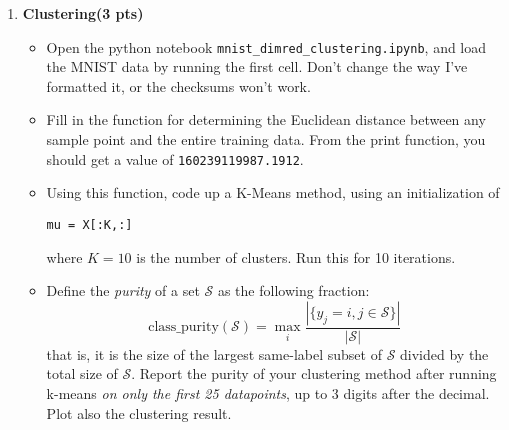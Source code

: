 \documentclass{article}
\newcommand{\mS}{\mathcal S}
\newcommand{\showpoints}[1]{\textbf{(#1 pts)} }
\begin{document}
\begin{enumerate}
\begin{enumerate}
\item \showpoints{1}  The probability that I wear a tank top, independently of all the other clothes, is 75\% if it's raining and 25\% if it's not raining.
\begin{itemize}
\item
Today is Monday and it is raining.

\item 
The probability that it will rain, given that the previous day rained, is 70\%. The probability that it will rain, given that the previous day did not rain, is 10\%. 

\end{itemize}
Draw a graphical model predicting whether I will wear a tank top on Wednesday, and calculate this probability.



\end{enumerate}






\item \textbf{Clustering}\showpoints{3} 



\begin{itemize}
\item Open the python notebook \texttt{mnist\_dimred\_clustering.ipynb}, and load the MNIST data by running the first cell. Don't change the way I've formatted it, or the checksums won't work.

\item Fill in the function for determining the Euclidean distance between any sample point and the entire training data.
From the print function, you should get a value of \texttt{160239119987.1912}.


\item Using this function, code up a K-Means method, using an initialization of 
\begin{verbatim}
mu = X[:K,:]
\end{verbatim}
where $K =10$ is the number of clusters. Run this for 10 iterations.

\item Define the \emph{purity} of a set $\mS$ as the following fraction:
\[
\text{class\_purity}(\mathcal S) = \max_i\frac{|\{y_j = i, j\in\mS\}|}{|\mS|}
\]
that is, it is the size of the largest same-label subset of $\mathcal S$ divided by the total size of $\mathcal S$.
Report the purity of your clustering method after running k-means \emph{on only the first 25 datapoints}, up to 3 digits after the decimal. Plot also the clustering result.






\end{itemize}
\end{enumerate}
\end{document}

